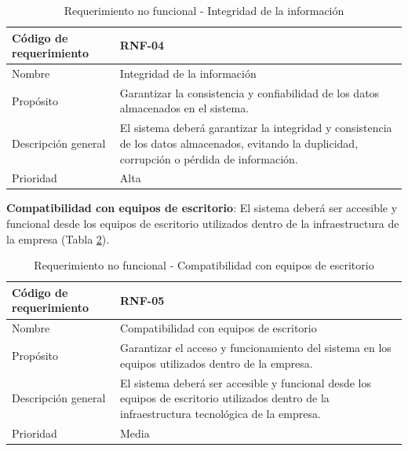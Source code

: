 \begin{table}[H]
    \centering
    \caption{Requerimiento no funcional - Integridad de la información}
    \label{tab:rnf_integridad}
    \begin{tabularx}{\textwidth}{|X|X|}
        \hline
        Código de requerimiento & RNF-04                                                                                                                                           \\ \hline
        Nombre                  & Integridad de la información                                                                                                                     \\ \hline
        Propósito               & Garantizar la consistencia y confiabilidad de los datos almacenados en el sistema.                                                               \\ \hline
        Descripción general     & El sistema deberá garantizar la integridad y consistencia de los datos almacenados, evitando la duplicidad, corrupción o pérdida de información. \\ \hline
        Prioridad               & Alta                                                                                                                                             \\ \hline
    \end{tabularx}
\end{table}


\textbf{Compatibilidad con equipos de escritorio}: El sistema deberá ser accesible y funcional desde los equipos de escritorio utilizados dentro de la infraestructura de la empresa (Tabla \ref{tab:rnf_compatibilidad}).

\begin{table}[H]
    \centering
    \caption{Requerimiento no funcional - Compatibilidad con equipos de escritorio}
    \label{tab:rnf_compatibilidad}
    \begin{tabularx}{\textwidth}{|X|X|}
        \hline
        Código de requerimiento & RNF-05                                                                                                                                         \\ \hline
        Nombre                  & Compatibilidad con equipos de escritorio                                                                                                       \\ \hline
        Propósito               & Garantizar el acceso y funcionamiento del sistema en los equipos utilizados dentro de la empresa.                                              \\ \hline
        Descripción general     & El sistema deberá ser accesible y funcional desde los equipos de escritorio utilizados dentro de la infraestructura tecnológica de la empresa. \\ \hline
        Prioridad               & Media                                                                                                                                          \\ \hline
    \end{tabularx}
\end{table}